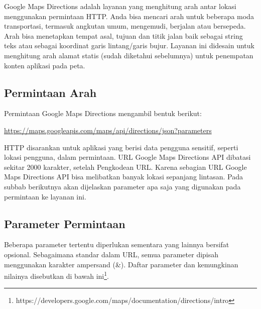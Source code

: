 Google Maps Directions adalah layanan yang menghitung arah antar lokasi menggunakan permintaan HTTP. Anda bisa mencari arah untuk beberapa moda transportasi, termasuk angkutan umum, mengemudi, berjalan atau bersepeda. Arah bisa menetapkan tempat asal, tujuan dan titik jalan baik sebagai string teks atau sebagai koordinat garis lintang/garis bujur. Layanan ini didesain untuk menghitung arah alamat statis (sudah diketahui sebelumnya) untuk penempatan konten aplikasi pada peta.

\subsection{Permintaan Arah}
\label{subsec:permintaanarahgoogledir}

Permintaan Google Maps Directions mengambil bentuk berikut:

\url{https://maps.googleapis.com/maps/api/directions/json?parameters}

HTTP disarankan untuk aplikasi yang berisi data pengguna sensitif, seperti lokasi pengguna, dalam permintaan. URL Google Maps Directions API dibatasi sekitar 2000 karakter, setelah Pengkodean URL. Karena sebagian URL Google Maps Directions API bisa melibatkan banyak lokasi sepanjang lintasan. Pada subbab berikutnya akan dijelaskan parameter apa saja yang digunakan pada permintaan ke layanan ini.

\subsection{Parameter Permintaan}
\label{subsec:parameterpermintaangoogledir}

Beberapa parameter tertentu diperlukan sementara yang lainnya bersifat opsional. Sebagaimana standar dalam URL, semua parameter dipisah menggunakan karakter ampersand (\&). Daftar parameter dan kemungkinan nilainya disebutkan di bawah ini\footnote{https://developers.google.com/maps/documentation/directions/intro}.

